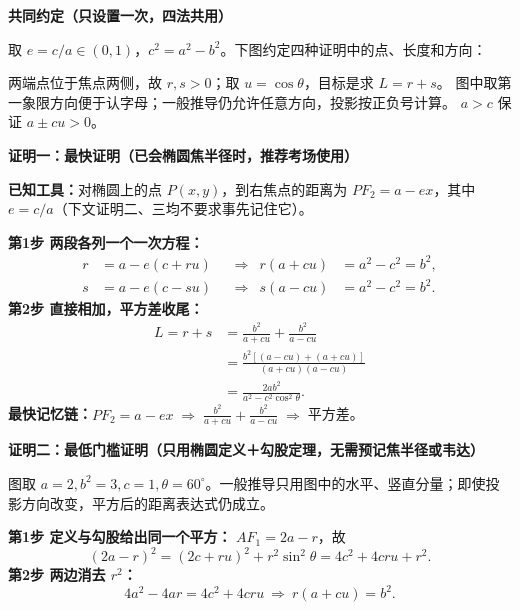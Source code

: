 \clearpage
\begin{proofbox}

\textbf{\textcolor{CProof}{共同约定（只设置一次，四法共用）}}

取 $e=c/a\in(0,1)$，$c^2=a^2-b^2$。下图约定四种证明中的点、长度和方向：

\begin{center}\end{center}

两端点位于焦点两侧，故 $r,s>0$；取 $u=\cos\theta$，目标是求 $L=r+s$。
图中取第一象限方向便于认字母；一般推导仍允许任意方向，投影按正负号计算。
$a>c$ 保证 $a\pm cu>0$。

\end{proofbox}
\clearpage
\begin{proofbox}
\textbf{\textcolor{CProof}{证明一：最快证明（已会椭圆焦半径时，推荐考场使用）}}

\textbf{已知工具：}对椭圆上的点 $P(x,y)$，到右焦点的距离为
$PF_2=a-ex$，其中 $e=c/a$（下文证明二、三均不要求事先记住它）。

\textbf{第1步 两段各列一个一次方程：}
\[
\begin{aligned}
 r&=a-e(c+ru)
   &&\Longrightarrow& r(a+cu)&=a^2-c^2=b^2,\\
 s&=a-e(c-su)
   &&\Longrightarrow& s(a-cu)&=a^2-c^2=b^2.
\end{aligned}
\]
\textbf{第2步 直接相加，平方差收尾：}
\[
\begin{aligned}
 L=r+s
 &=\frac{b^2}{a+cu}+\frac{b^2}{a-cu}\\
 &=\frac{b^2[(a-cu)+(a+cu)]}{(a+cu)(a-cu)}\\
 &=\boxed{\frac{2ab^2}{a^2-c^2\cos^2\theta}}.
\end{aligned}
\]
\textbf{最快记忆链：}$\displaystyle PF_2=a-ex\;\Rightarrow\;
\frac{b^2}{a+cu}+\frac{b^2}{a-cu}\;\Rightarrow\;$平方差。

\medskip
\end{proofbox}
\clearpage
\begin{proofbox}
\textbf{\textcolor{CProof}{证明二：最低门槛证明（只用椭圆定义＋勾股定理，无需预记焦半径或韦达）}}


\begin{center}\end{center}
图取 $a=2,b^2=3,c=1,\theta=60^\circ$。一般推导只用图中的水平、竖直分量；即使投影方向改变，平方后的距离表达式仍成立。


\textbf{第1步 定义与勾股给出同一个平方：}
$AF_1=2a-r$，故
\[
 (2a-r)^2=(2c+ru)^2+r^2\sin^2\theta=4c^2+4cru+r^2.
\]
\textbf{第2步 两边消去 $r^2$：}
\[
 4a^2-4ar=4c^2+4cru
 \ \Longrightarrow\ \boxed{r(a+cu)=b^2}.
\]
\end{proofbox}
